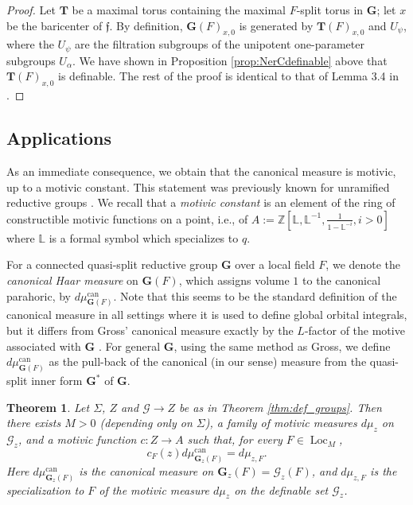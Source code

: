 \documentclass{amsart}
\newcommand{\Z}{{\mathbb Z}}
\newcommand{\cG}{\mathcal{G}}
\DeclareMathOperator{\loc}{Loc}
\newcommand{\bG}{\mathbf{G}}
\newcommand{\bT}{\mathbf {T}}
\newcommand{\can}{\mathrm{can}}
\newcommand{\ff}{{\mathfrak f}}
\newcommand\lef{\mathbb L}
\theoremstyle{plain}
\newtheorem{theorem}[thm]{Theorem}
\theoremstyle{definition}
\begin{document}
\begin{proof} Let $\bT$ be a maximal torus containing the maximal $F$-split torus in $\bG$; let $x$ be the baricenter of $\ff$.
By definition, $\bG(F)_{x,0}$ is generated by $\bT(F)_{x, 0}$ and $U_\psi$, where the $U_\psi$ are
the filtration subgroups of the unipotent one-parameter subgroups $U_{\alpha}$. 
We have shown in Proposition \ref{prop:NerCdefinable} above that  $\bT(F)_{x, 0}$ is definable.
The rest of the proof is identical to that of Lemma 3.4 in \cite{cluckers-gordon-halupczok:14b}.  
\end{proof} 

\subsection{Applications} 
As an immediate consequence, we obtain that the canonical measure is motivic, up to a motivic constant.
This statement was previously known for unramified reductive groups \cite{cluckers-hales-loeser}.
We recall that a \emph{motivic constant} is an element of the ring of constructible motivic functions on a point,
i.e., of $A:=\Z[\lef, \lef^{-1}, \frac{1}{1-\lef^{-i}}, i>0]$ where $\lef$ is a formal symbol which specializes to $q$.

For a connected quasi-split reductive group $\bG$ over a local field $F$, we denote the \emph{canonical Haar measure}
on $\bG(F)$, which assigns volume $1$ to the canonical parahoric, by $d\mu_{\bG(F)}^\can$. 
Note that this seems to be the standard definition of the canonical measure in all settings
where it is used to define global orbital integrals, but it differs from Gross' canonical measure
exactly by the $L$-factor of the motive associated with $\bG$ \cite{gross:97a}.  For general $\bG$, using the same method as Gross, 
we define $d\mu_{\bG(F)}^\can$ as the pull-back of the canonical (in our sense) measure from the quasi-split inner form $\bG^\ast$ of $\bG$.  

\begin{theorem}\label{thm:mot_meas}
 Let $\Sigma$, $Z$  and $\cG \to Z$ be as in Theorem \ref{thm:def_groups}. 
Then there exists $M>0$ (depending only on $\Sigma$), a family of  motivic measures
$d\mu_z$ on $\cG_z$, and a motivic function $c:Z\to A$ such that, for every $F\in \loc_M$,
\[
c_F(z) d\mu_{\bG_z(F)}^\can = d\mu_{z, F}.
\]
Here $d\mu_{\bG_z(F)}^\can$ is the canonical measure on $\bG_z(F)=\cG_z(F)$,
and $d\mu_{z, F}$ is the specialization to $F$ of the motivic measure $d\mu_z$ on the definable set $\cG_z$. 
\end{theorem} 
\end{document}
